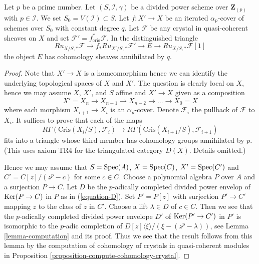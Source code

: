 \begin{lemma}
\label{lemma-pullback-along-p-power-cover}
Let $p$ be a prime number. Let $(S, \mathcal{I}, \gamma)$ be a divided power
scheme over $\mathbf{Z}_{(p)}$ with $p \in \mathcal{I}$. We set
$S_0 = V(\mathcal{I}) \subset S$. Let $f : X' \to X$ be an iterated
$\alpha_p$-cover of schemes over $S_0$ with constant degree $q$. Let
$\mathcal{F}$ be any crystal in quasi-coherent sheaves on $X$ and set
$\mathcal{F}' = f_{\text{cris}}^*\mathcal{F}$.
In the distinguished triangle
$$
Ru_{X/S, *}\mathcal{F}
\longrightarrow
f_*Ru_{X'/S, *}\mathcal{F}'
\longrightarrow
E
\longrightarrow
Ru_{X/S, *}\mathcal{F}[1]
$$
the object $E$ has cohomology sheaves annihilated by $q$.
\end{lemma}

\begin{proof}
Note that $X' \to X$ is a homeomorphism hence we can identify the underlying
topological spaces of $X$ and $X'$. The question is clearly local on $X$,
hence we may assume $X$, $X'$, and $S$ affine and $X' \to X$ given as a
composition
$$
X' = X_n \to X_{n - 1} \to X_{n - 2} \to \ldots \to X_0 = X
$$
where each morphism $X_{i + 1} \to X_i$ is an $\alpha_p$-cover.
Denote $\mathcal{F}_i$ the pullback of $\mathcal{F}$ to $X_i$.
It suffices to prove that each of the maps
$$
R\Gamma(\text{Cris}(X_i/S), \mathcal{F}_i)
\longrightarrow
R\Gamma(\text{Cris}(X_{i + 1}/S), \mathcal{F}_{i + 1})
$$
fits into a triangle whose third member has cohomology groups annihilated
by $p$. (This uses axiom TR4 for the triangulated category $D(X)$. Details
omitted.)

\medskip\noindent
Hence we may assume that $S = \mathop{\mathrm{Spec}}(A)$, $X = \mathop{\mathrm{Spec}}(C)$, $X' = \mathop{\mathrm{Spec}}(C')$
and $C' = C[z]/(z^p - c)$ for some $c \in C$. Choose a polynomial algebra
$P$ over $A$ and a surjection $P \to C$. Let $D$ be the $p$-adically completed
divided power envelop of $\mathop{\mathrm{Ker}}(P \to C)$ in $P$ as in (\ref{equation-D}).
Set $P' = P[z]$ with surjection $P' \to C'$ mapping $z$ to the class of $z$
in $C'$. Choose a lift $\lambda \in D$ of $c \in C$. Then we see that
the $p$-adically completed divided power envelope $D'$ of
$\mathop{\mathrm{Ker}}(P' \to C')$ in $P'$ is isomorphic to the $p$-adic completion of
$D[z]\langle \xi \rangle/(\xi - (z^p - \lambda))$, see
Lemma \ref{lemma-computation} and its proof.
Thus we see that the result follows from this lemma
by the computation of cohomology of crystals in quasi-coherent modules in
Proposition \ref{proposition-compute-cohomology-crystal}.
\end{proof}

